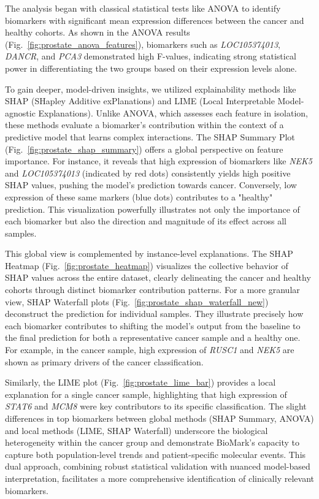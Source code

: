 \documentclass[journal]{IEEEtran}
\begin{document}
The analysis began with classical statistical tests like ANOVA to identify biomarkers with significant mean expression differences between the cancer and healthy cohorts. As shown in the ANOVA results (Fig.~\ref{fig:prostate_anova_features}), biomarkers such as \textit{LOC105374013}, \textit{DANCR}, and \textit{PCA3} demonstrated high F-values, indicating strong statistical power in differentiating the two groups based on their expression levels alone.

To gain deeper, model-driven insights, we utilized explainability methods like SHAP (SHapley Additive exPlanations) and LIME (Local Interpretable Model-agnostic Explanations). Unlike ANOVA, which assesses each feature in isolation, these methods evaluate a biomarker's contribution within the context of a predictive model that learns complex interactions. The SHAP Summary Plot (Fig.~\ref{fig:prostate_shap_summary}) offers a global perspective on feature importance. For instance, it reveals that high expression of biomarkers like \textit{NEK5} and \textit{LOC105374013} (indicated by red dots) consistently yields high positive SHAP values, pushing the model's prediction towards cancer. Conversely, low expression of these same markers (blue dots) contributes to a "healthy" prediction. This visualization powerfully illustrates not only the importance of each biomarker but also the direction and magnitude of its effect across all samples.

This global view is complemented by instance-level explanations. The SHAP Heatmap (Fig.~\ref{fig:prostate_heatmap}) visualizes the collective behavior of SHAP values across the entire dataset, clearly delineating the cancer and healthy cohorts through distinct biomarker contribution patterns. For a more granular view, SHAP Waterfall plots (Fig.~\ref{fig:prostate_shap_waterfall_new}) deconstruct the prediction for individual samples. They illustrate precisely how each biomarker contributes to shifting the model's output from the baseline to the final prediction for both a representative cancer sample and a healthy one. For example, in the cancer sample, high expression of \textit{RUSC1} and \textit{NEK5} are shown as primary drivers of the cancer classification.

Similarly, the LIME plot (Fig.~\ref{fig:prostate_lime_bar}) provides a local explanation for a single cancer sample, highlighting that high expression of \textit{STAT6} and \textit{MCM8} were key contributors to its specific classification. The slight differences in top biomarkers between global methods (SHAP Summary, ANOVA) and local methods (LIME, SHAP Waterfall) underscore the biological heterogeneity within the cancer group and demonstrate BioMark's capacity to capture both population-level trends and patient-specific molecular events. This dual approach, combining robust statistical validation with nuanced model-based interpretation, facilitates a more comprehensive identification of clinically relevant biomarkers.
\end{document}
